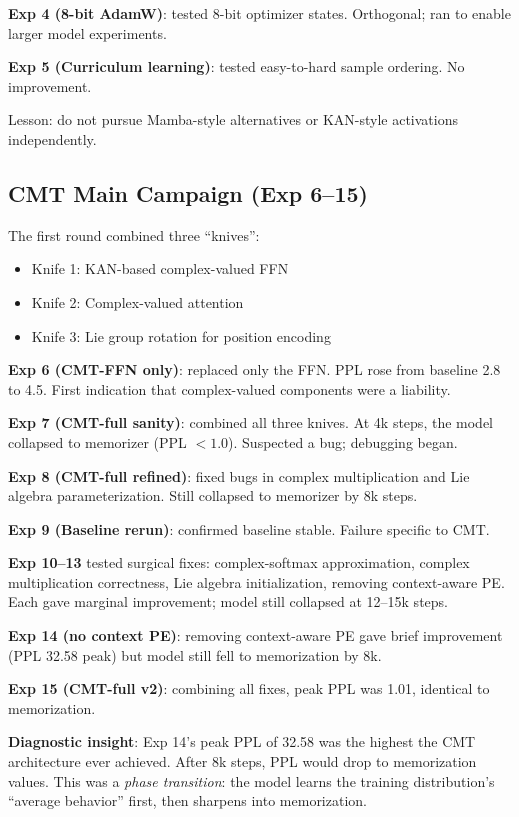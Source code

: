 \documentclass{article}
\begin{document}
\textbf{Exp 4 (8-bit AdamW)}: tested 8-bit optimizer states. Orthogonal; ran to enable larger model experiments.

\textbf{Exp 5 (Curriculum learning)}: tested easy-to-hard sample ordering. No improvement.

Lesson: do not pursue Mamba-style alternatives or KAN-style activations independently.

\subsection{CMT Main Campaign (Exp 6--15)}

The first round combined three ``knives'':
\begin{itemize}
    \item Knife 1: KAN-based complex-valued FFN
    \item Knife 2: Complex-valued attention
    \item Knife 3: Lie group rotation for position encoding
\end{itemize}

\textbf{Exp 6 (CMT-FFN only)}: replaced only the FFN. PPL rose from baseline 2.8 to 4.5. First indication that complex-valued components were a liability.

\textbf{Exp 7 (CMT-full sanity)}: combined all three knives. At 4k steps, the model collapsed to memorizer (PPL $< 1.0$). Suspected a bug; debugging began.

\textbf{Exp 8 (CMT-full refined)}: fixed bugs in complex multiplication and Lie algebra parameterization. Still collapsed to memorizer by 8k steps.

\textbf{Exp 9 (Baseline rerun)}: confirmed baseline stable. Failure specific to CMT.

\textbf{Exp 10--13} tested surgical fixes: complex-softmax approximation, complex multiplication correctness, Lie algebra initialization, removing context-aware PE. Each gave marginal improvement; model still collapsed at 12--15k steps.

\textbf{Exp 14 (no context PE)}: removing context-aware PE gave brief improvement (PPL 32.58 peak) but model still fell to memorization by 8k.

\textbf{Exp 15 (CMT-full v2)}: combining all fixes, peak PPL was 1.01, identical to memorization.

\textbf{Diagnostic insight}: Exp 14's peak PPL of 32.58 was the highest the CMT architecture ever achieved. After 8k steps, PPL would drop to memorization values. This was a \emph{phase transition}: the model learns the training distribution's ``average behavior'' first, then sharpens into memorization.
\end{document}
